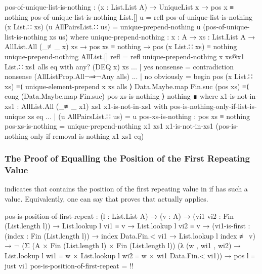 \documentclass{report}
\begin{document}
\begin{code}
    pos-of-unique-list-is-nothing :
      (x : List.List A) →
      UniqueList x →
      pos x ≡ nothing
    pos-of-unique-list-is-nothing List.[] u = refl
    pos-of-unique-list-is-nothing (x List.∷ xs) (u AllPairsList.∷ us) =
      unique-prepend-nothing u (pos-of-unique-list-is-nothing xs us)
      where
      unique-prepend-nothing :
        {x : A} →
        {xs : List.List A} →
        AllList.All (_≢_ x) xs →
        pos xs ≡ nothing →
        pos (x List.∷ xs) ≡ nothing
      unique-prepend-nothing AllList.[] refl = refl
      unique-prepend-nothing {x} xs@{x1 List.∷ xs1} alls eq with any? (DEQ x) xs
      ... | yes nonsense = contradiction nonsense (AllListProp.All¬⇒¬Any alls)
      ... | no obviously = begin
        pos (x List.∷ xs)
          ≡⟨ unique-element-prepend x xs alls ⟩
        Data.Maybe.map Fin.suc (pos xs)
          ≡⟨ cong (Data.Maybe.map Fin.suc) pos-xs-is-nothing ⟩
        nothing ∎
        where
        x1-is-not-in-xs1 : AllList.All (_≢_ x1) xs1
        x1-is-not-in-xs1 with pos-is-nothing-only-if-list-is-unique xs eq
        ... | (u AllPairsList.∷ us) = u
        pos-xs-is-nothing : pos xs ≡ nothing
        pos-xs-is-nothing =
          unique-prepend-nothing {x1} {xs1}
                                 x1-is-not-in-xs1
                                 (pos-is-nothing-only-if-removal-is-nothing {x1} {xs1} eq)
\end{code}

\subsubsection{The Proof of Equalling the Position of the First Repeating Value}
 indicates that   contains the position of the first repeating value in  if  has such a value.  Equivalently, one can say that  proves that  actually applies.\label{sec:firstRepeatPosition-isFirst}

\begin{code}
    pos-is-position-of-first-repeat :
      (l : List.List A) →
      (v : A) →
      (vi1 vi2 : Fin (List.length l)) →
      List.lookup l vi1 ≡ v →
      List.lookup l vi2 ≡ v →
      (vi1-is-first : (index : Fin (List.length l)) →
                      index Data.Fin.< vi1 →
                      List.lookup l index ≢ v) →
      ¬ (Σ (A × Fin (List.length l) × Fin (List.length l))
           (λ (w , wi1 , wi2) →
                List.lookup l wi1 ≡ w
              × List.lookup l wi2 ≡ w
              × wi1 Data.Fin.< vi1)) →
      pos l ≡ just vi1
    pos-is-position-of-first-repeat = {!!}
\end{code}
\end{document}
